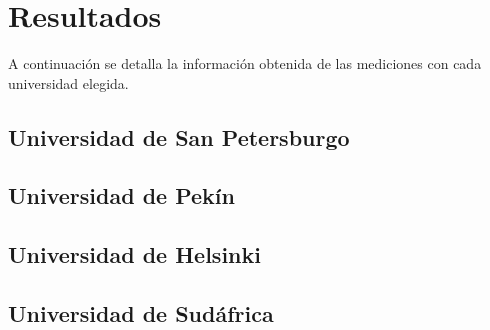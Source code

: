 \section{Resultados}
A continuación se detalla la información obtenida de las mediciones con cada universidad elegida.

\subsection{Universidad de San Petersburgo}


\subsection{Universidad de Pekín}


\subsection{Universidad de Helsinki}


\subsection{Universidad de Sudáfrica}
